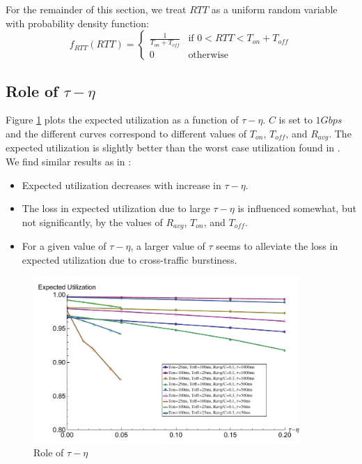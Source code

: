   For the remainder of this section, we treat $RTT$ as a uniform random 
  variable with probability density function:
  \begin{equation}
    f_{RTT}(RTT) =
    \begin{cases}
        \frac{1}{T_{on} + T_{off}} & \text{if } 0 < RTT < T_{on} + T_{off} \\
        0 & \text{otherwise}
    \end{cases}
    \label{rttpdf}
  \end{equation}

  \subsection{Role of $\tau - \eta$}
    Figure \ref{rtttaueta} plots the expected utilization as a function of 
    $\tau - \eta$. $C$ is set to $1Gbps$ and the different curves correspond 
    to different values of $T_{on}$, $T_{off}$, and $R_{avg}$. The expected 
    utilization is slightly better than the worst case utilization found in 
    \cite{Lovewell2011-Noise-TR}. We find similar results as in 
    \cite{Lovewell2011-Noise-TR}:
    \begin{itemize}
      \item Expected utilization  decreases with increase in $\tau - \eta$.
      \item The loss in expected utilization due to large $\tau - \eta$ is 
      influenced somewhat, but not significantly, by the values of $R_{avg}$, 
      $T_{on}$, and $T_{off}$.
      \item For a given value of $\tau - \eta$, a larger value of $\tau$ seems 
      to alleviate the loss in expected utilization due to cross-traffic 
      burstiness.
    \end{itemize}
    \newpage
    \begin{figure}[h]
      \centering
      \includegraphics[width=0.9\textwidth]{img/rtttaueta.pdf}
      \caption{Role of $\tau - \eta$}
      \label{rtttaueta}
    \end{figure}

